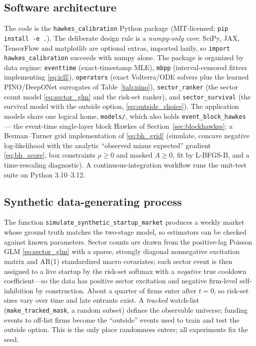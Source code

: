 \documentclass[11pt]{article}
\theoremstyle{plain}
\theoremstyle{definition}
\theoremstyle{remark}
\newcommand{\code}[1]{\texttt{#1}}
\begin{document}
\subsection{Software architecture}
The code is the \code{hawkes\_calibration} Python package (MIT-licensed; \code{pip install -e .}). The deliberate design rule is a \emph{numpy-only core}: SciPy, JAX, TensorFlow and matplotlib are optional extras, imported lazily, so \code{import hawkes\_calibration} succeeds with numpy alone. The package is organized by data regime: \code{eventtime} (exact-timestamp MLE), \code{mbpp} (interval-censored fitters implementing \eqref{eq:icll}), \code{operators} (exact Volterra/ODE solvers plus the learned PINO/DeepONet surrogates of Table~\ref{tab:pino}), \code{sector\_ranker} (the sector count model \eqref{eq:sector_glm} and the risk-set ranker), and \code{sector\_survival} (the survival model with the outside option, \eqref{eq:outside_choice}). The application models share one logical home, \code{models/}, which also holds \code{event\_block\_hawkes} --- the event-time single-layer block Hawkes of Section~\ref{sec:blockhawkes}: a Berman--Turner grid implementation of \eqref{eq:bh_grid} (simulate, concave negative log-likelihood with the analytic ``observed minus expected'' gradient \eqref{eq:bh_score}, box constraints $\rho\ge0$ and masked $A\ge0$, fit by L-BFGS-B, and a time-rescaling diagnostic). A continuous-integration workflow runs the unit-test suite on Python 3.10--3.12.

\subsection{Synthetic data-generating process}
The function \code{simulate\_synthetic\_startup\_market} produces a weekly market whose ground truth matches the two-stage model, so estimators can be checked against known parameters. Sector counts are drawn from the positive-lag Poisson GLM \eqref{eq:sector_glm} with a sparse, strongly diagonal nonnegative excitation matrix and AR(1) standardized macro covariates; each sector event is then assigned to a live startup by the risk-set softmax with a \emph{negative} true cooldown coefficient---so the data has positive sector excitation and negative firm-level self-inhibition by construction. About a quarter of firms enter after $t=0$, so risk-set sizes vary over time and late entrants exist. A \emph{tracked} watch-list (\code{make\_tracked\_mask}, a random subset) defines the observable universe; funding events to off-list firms become the ``outside'' events used to train and test the outside option. This is the only place randomness enters; all experiments fix the seed.
\end{document}
